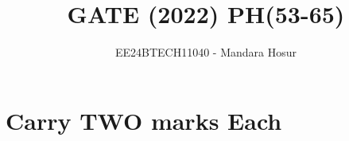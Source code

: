 \documentclass[journal]{IEEEtran}
\begin{document}

\vspace{3cm}

\title{GATE (2022) PH(53-65)}
\author{EE24BTECH11040 - Mandara Hosur}
{\let\newpage\relax\maketitle}

\renewcommand{\thefigure}{\theenumi}
\renewcommand{\thetable}{\theenumi}
\setlength{\intextsep}{10pt} %


\renewcommand{\thetable}{\theenumi}

\section*{\textbf{Carry TWO marks Each}}
\end{document}
